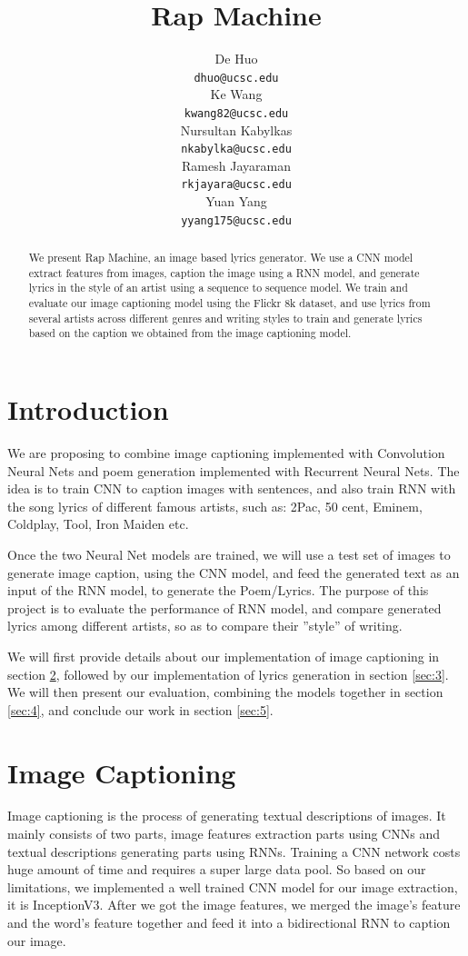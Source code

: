 \documentclass{article}
\title{Rap Machine}
\author{
  De Huo \\ \texttt{dhuo@ucsc.edu} \\ \And
  Ke Wang \\ \texttt{kwang82@ucsc.edu} \\ \And
  Nursultan Kabylkas \\ \texttt{nkabylka@ucsc.edu} \\ \And
  Ramesh Jayaraman \\ \texttt{rkjayara@ucsc.edu} \\ \And
  Yuan Yang \\ \texttt{yyang175@ucsc.edu} 
}
\begin{document}
\maketitle

\begin{abstract}
We present Rap Machine, an image based lyrics generator. We use a CNN model extract features from images, caption the image using a RNN model, and generate lyrics in the style of an artist using a sequence to sequence model. We train and evaluate our image captioning model using the Flickr 8k dataset, and use lyrics from several artists across different genres and writing styles to train and generate lyrics based on the caption we obtained from the image captioning model.
\end{abstract}

\section{Introduction}

We are proposing to combine image captioning implemented with Convolution
Neural Nets and poem generation implemented with Recurrent Neural Nets.
The idea is to train CNN to caption images with sentences, and also train RNN
with the song lyrics of different famous artists, such as: 2Pac, 50 cent, Eminem, Coldplay, Tool, Iron Maiden etc.

Once the two Neural Net models are trained, we will use a test set of images
to generate image caption, using the CNN model, and feed the generated text as
an input of the RNN model, to generate the Poem/Lyrics. The purpose of this
project is to evaluate the performance of RNN model, and compare generated
lyrics among different artists, so as to compare their ”style” of writing.

We will first provide details about our implementation of image captioning in section \ref{sec:2}, followed by  our implementation of lyrics generation in section \ref{sec:3}. We will then present our evaluation, combining the models together in section \ref{sec:4}, and conclude our work in section \ref{sec:5}.

\section{Image Captioning}
\label{sec:2}
Image captioning is the process of generating textual descriptions of images. It mainly consists of two parts, image features extraction parts using CNNs and textual descriptions generating parts using RNNs. Training a CNN network costs huge amount of time and requires a super large data pool. So based on our limitations, we implemented a well trained CNN model for our image extraction, it is InceptionV3. After we got the image features, we merged the image’s feature and the word’s feature together and feed it into a bidirectional RNN to caption our image. 
\end{document}
